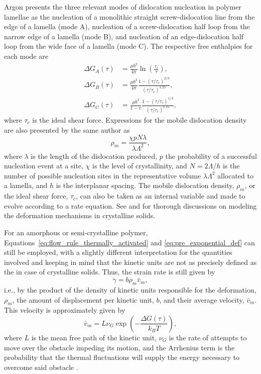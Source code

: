 Argon \citep{argonPhysicsDeformationFracture2013a} presents the three relevant modes of dislocation nucleation in polymer lamellae as the nucleation of a monolithic straight screw-dislocation line from the edge of a lamella (mode A), nucleation of a screw-dislocation half loop from the narrow edge of a lamella (mode B), and nucleation of an edge-dislocation half loop from the wide face of a lamella (mode C).
The respective free enthalpies for each mode are
\begin{align}
	\Delta G_A(\tau)&=\frac{\mu b^2}{4 \pi} \ln\left(\frac{\tau_c}{\tau}\right),\\
	\Delta G_B(\tau)&=\frac{\mu b^2}{4 \pi} \frac{1-(\tau/\tau_c)^{2 / 3}}{(\tau/\tau_c)^{1.25} },\\
	\Delta G_C(\tau)&=\frac{\mu b^3}{1-v} \frac{1-(\tau/\tau_c)^{1 / 3}}{(\tau/\tau_c)^{1.15} },
\end{align}
where $\tau_c$ is the ideal shear force.
Expressions for the mobile dislocation density are also presented by the same author as
\begin{equation}
	\rho_m = \frac{\chi p N \lambda}{\lambda \Lambda^2},
\end{equation}
where $\lambda$ is the length of the dislocation produced, $p$ the probability of a successful nucleation event at a site, $\chi$ is the level of crystallinity, and $N = 2\Lambda/h$ is the number of possible nucleation sites in the representative volume $\lambda \Lambda^2$ allocated to a lamella, and $h$ is the interplanar spacing.
The mobile dislocation density, $\rho_m$, or the ideal shear force, $\tau_c$, can also be taken as an internal variable and made to evolve according to a rate equation.
See \cite{klahn1970strain} and \cite{kocks1975thermodynamics} for thorough discussions on modeling the deformation mechanisms in crystalline solids.

For an amorphous or semi-crystalline polymer,  Equations~\eqref{eq:flow_rule_thermally_activated} and \eqref{eq:pre_exponential_def} can still be employed, with a slightly different interpretation for the quantities involved and keeping in mind that the kinetic units are not as precisely defined as the in case of crystalline solids.
Thus, the strain rate is still given by
\begin{equation}
  \label{eq:plaston_formula}
  \dot \gamma = b \rho_m \bar{v}_m,
\end{equation}
i.e., by the product of the density of kinetic units responsible for the deformation, $\rho_m$, the amount of displacement per kinetic unit, $b$, and their average velocity, $\bar v_m$.
This velocity is approximately given by
\begin{equation}
  \bar v_m = L \nu_G \exp\left(-\frac{\Delta G(\tau)}{k_B T}\right),
\end{equation}
where $L$ is the mean free path of the kinetic unit, $\nu_G$ is the rate of attempts to move over the obstacle impeding its motion, and the Arrhenius term is the probability that the thermal fluctuations will supply the energy necessary to overcome said obstacle \citep{gsellYieldTransientEffects1981, gilmanPLASTICWAVEMYTH1992}.

